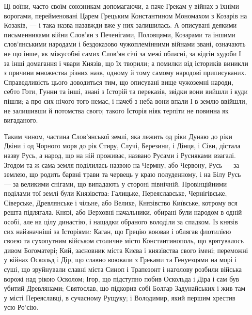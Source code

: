 Ці воїни, часто своїм союзникам допомагаючи, а паче Грекам у війнах з їхніми
ворогами, перейменовані Царем Грецьким Константином Мономахом з Козарів на
Козаків, — і така назва назавжди вже у них залишилась. А описувані деякими
письменниками війни Слов'ян з Печенігами, Половцями, Козарами та іншими
слов'янськими народами і бездоказово чужоплемінними війнами звані, означають не
що інше, як міжусобні самих Слов'ян січі за межі обласні, за відгін худоби І за
інші домагання і чвари Князів, що їх творили; а помилки від істориків виникли з
причини множества різних назв, одному й тому самому народові приписуваних.
Справедливість цього доводиться тим, що описувані вище чужоземні народи, себто
Готи, Гунни та інші, знані з Історій та переказів, звідки вони вийшли і куди
пішли; а про сих нічого того немає, і начеб з неба вони впали І в землю
ввійшли, не залишивши й потомства свого; такого Історія ніяк терпіти не повинна
як вигаданого.

Таким чином, частина Слов'янської землі, яка лежить од ріки Дунаю до ріки Двіни
і од Чорного моря до рік Стиру, Случі, Березини, і Дінця, і Сіви, дістала назву
Русь, а народ, що на ній проживає, названо Русами і Русняками взагалі. Згодом
та ж сама земля поділилась назвою на Чермну, або Червону, Русь — за землею, що
родить барвні трави та червець у краю полуденному, і на Білу Русь — за великими
снігами, що випадають у стороні північній.  Провінційними поділами тої землі
були Князівства: Галицьке, Переяславське, Чернігівське, Сіверське, Древлянське
і чільне, або Велике, Князівство Київське, котрому вся решта підлягала. Князі,
або Верховні начальники, обирані були народом в одній особі, але на цілу
династію, і нащадки обраного володіли за спадком. Із князів сих найзначніші за
Історіями: Каган, що Грецію воював і облягав флотилією своєю та сухопутним
військом столичне місто Константинополь, що врятувалось дивом Богоматері; Кий,
засновник міста Києва і князівства свого імені; переможні у війнах Оскольд і
Дір, що славно воювали з Греками та Генуезцями на морі і суші, що зруйнували
славні міста Синоп і Трапезонт і наголову розбили війська ворожі над рікою
Осколом; Ігор, що підступно побив Оскольда і Діра і сам був убитий Древлянами;
Святослав, що підкорив собі Болгар Задунайських і жив там у місті Переяславці,
в сучасному Рущуку; і Володимир, який першим хрестив усю Ро'сію.

